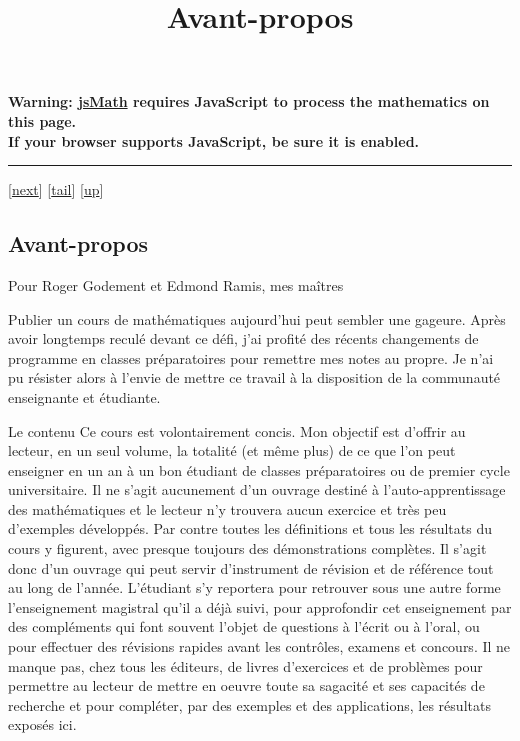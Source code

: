 \documentclass[]{article}
\title{Avant-propos}
\author{}
\date{}
\begin{document}
\maketitle

\textbf{Warning: \href{http://www.math.union.edu/locate/jsMath}{jsMath}
requires JavaScript to process the mathematics on this page.\\ If your
browser supports JavaScript, be sure it is enabled.}

\begin{center}\rule{3in}{0.4pt}\end{center}

{[}\href{coursli1.html}{next}{]}
{[}\hyperref[tailcoursch1.html]{tail}{]}
{[}\href{cours.html\#coursch1.html}{up}{]}

\subsection{Avant-propos}

Pour Roger Godement et Edmond Ramis, mes maîtres

Publier un cours de mathématiques aujourd'hui peut sembler une gageure.
Après avoir longtemps reculé devant ce défi, j'ai profité des récents
changements de programme en classes préparatoires pour remettre mes
notes au propre. Je n'ai pu résister alors à l'envie de mettre ce
travail à la disposition de la communauté enseignante et étudiante.

Le contenu Ce cours est volontairement concis. Mon objectif est d'offrir
au lecteur, en un seul volume, la totalité (et même plus) de ce que l'on
peut enseigner en un an à un bon étudiant de classes préparatoires ou de
premier cycle universitaire. Il ne s'agit aucunement d'un ouvrage
destiné à l'auto-apprentissage des mathématiques et le lecteur n'y
trouvera aucun exercice et très peu d'exemples développés. Par contre
toutes les définitions et tous les résultats du cours y figurent, avec
presque toujours des démonstrations complètes. Il s'agit donc d'un
ouvrage qui peut servir d'instrument de révision et de référence tout au
long de l'année. L'étudiant s'y reportera pour retrouver sous une autre
forme l'enseignement magistral qu'il a déjà suivi, pour approfondir cet
enseignement par des compléments qui font souvent l'objet de questions à
l'écrit ou à l'oral, ou pour effectuer des révisions rapides avant les
contrôles, examens et concours. Il ne manque pas, chez tous les
éditeurs, de livres d'exercices et de problèmes pour permettre au
lecteur de mettre en oeuvre toute sa sagacité et ses capacités de
recherche et pour compléter, par des exemples et des applications, les
résultats exposés ici.
\end{document}
